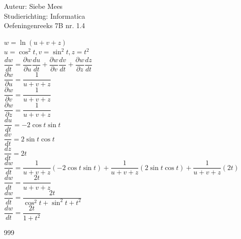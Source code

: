 \documentclass[a4paper]{article}
\begin{document}
  
\noindent \large Auteur: Siebe Mees \\
\noindent \large Studierichting: Informatica\\
\noindent \large Oefeningenreeks 7B nr. 1.4\\

\medskip

\normalsize

$w=\ln(u+v+z)$\\

$u=\cos^2t, v=\sin^2t, z=t^2$\\

$\dfrac{dw}{dt} =\dfrac{\partial w}{\partial u}\dfrac{du}{dt} +\dfrac{\partial w}{\partial v}\dfrac{dv}{dt} +\dfrac{\partial w}{\partial z}\dfrac{dz}{dt}$\\

$\dfrac{\partial w}{\partial u} =\dfrac{1}{u+v+z}$\\

$\dfrac{\partial w}{\partial v} =\dfrac{1}{u+v+z}$\\

$\dfrac{\partial w}{\partial z} =\dfrac{1}{u+v+z}$\\

$\dfrac{du}{dt} =-2\cos t\sin t$\\

$\dfrac{dv}{dt} =2\sin t\cos t$\\

$\dfrac{dz}{dt} =2t$\\

$\dfrac{dw}{dt}=\dfrac{1}{u+v+z}(-2\cos t\sin t)+\dfrac{1}{u+v+z}(2\sin t\cos t)+\dfrac{1}{u+v+z}(2t)$\\

$\dfrac{dw}{dt}=\dfrac{2t}{u+v+z}$\\

$\dfrac{dw}{dt}=\dfrac{2t}{\cos^2t+\sin^2t+t^2}$\\

$\dfrac{dw}{dt}=\dfrac{2t}{1+t^2}$\\

\begin{thebibliography}{999}
\end{thebibliography}
\end{document}
